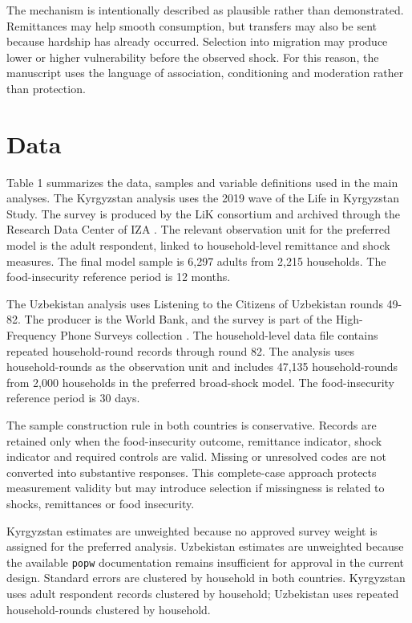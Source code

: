 \documentclass[11pt]{article}
\begin{document}
The mechanism is intentionally described as plausible rather than demonstrated. Remittances may help smooth consumption, but transfers may also be sent because hardship has already occurred. Selection into migration may produce lower or higher vulnerability before the observed shock. For this reason, the manuscript uses the language of association, conditioning and moderation rather than protection.

\section{Data}

Table 1 summarizes the data, samples and variable definitions used in the main analyses. The Kyrgyzstan analysis uses the 2019 wave of the Life in Kyrgyzstan Study. The survey is produced by the LiK consortium and archived through the Research Data Center of IZA \parencite{LIK2023}. The relevant observation unit for the preferred model is the adult respondent, linked to household-level remittance and shock measures. The final model sample is 6,297 adults from 2,215 households. The food-insecurity reference period is 12 months.

The Uzbekistan analysis uses Listening to the Citizens of Uzbekistan rounds 49-82. The producer is the World Bank, and the survey is part of the High-Frequency Phone Surveys collection \parencite{WorldBank2025a}. The household-level data file contains repeated household-round records through round 82. The analysis uses household-rounds as the observation unit and includes 47,135 household-rounds from 2,000 households in the preferred broad-shock model. The food-insecurity reference period is 30 days.

The sample construction rule in both countries is conservative. Records are retained only when the food-insecurity outcome, remittance indicator, shock indicator and required controls are valid. Missing or unresolved codes are not converted into substantive responses. This complete-case approach protects measurement validity but may introduce selection if missingness is related to shocks, remittances or food insecurity.

Kyrgyzstan estimates are unweighted because no approved survey weight is assigned for the preferred analysis. Uzbekistan estimates are unweighted because the available \texttt{popw} documentation remains insufficient for approval in the current design. Standard errors are clustered by household in both countries. Kyrgyzstan uses adult respondent records clustered by household; Uzbekistan uses repeated household-rounds clustered by household.
\end{document}

